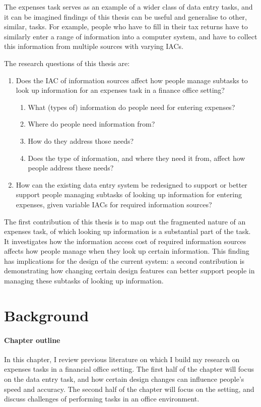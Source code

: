 \documentclass[11pt,oneside]{report}
\begin{document}
The expenses task serves as an example of a wider class of data entry tasks, and it can be imagined findings of this thesis can be useful and generalise to other, similar, tasks. For example, people who have to fill in their tax returns have to similarly enter a range of information into a computer system, and have to collect this information from multiple sources with varying IACs.

The research questions of this thesis are:

\begin{enumerate}
\item Does the IAC of information sources affect how people manage subtasks to look up information for an expenses task in a finance office setting?
\begin{enumerate}
\item	What (types of) information do people need for entering expenses?
\item	Where do people need information from?
\item	How do they address those needs?
\item	Does the type of information, and where they need it from, affect how people address these needs?
\end{enumerate}
\item	How can the existing data entry system be redesigned to support or better support people managing subtasks of looking up information for entering expenses, given variable IACs for required information sources?
\end{enumerate}


The first contribution of this thesis is to map out the fragmented nature of an expenses task, of which looking up information is a substantial part of the task. It investigates how the information access cost of required information sources affects how people manage when they look up certain information. This finding has implications for the design of the current system: a second contribution is demonstrating how changing certain design features can better support people in managing these subtasks of looking up information.



\chapter{Background}\label{ch:Background}

\begin{mynote}
\subsubsection{Chapter outline}
In this chapter, I review previous literature on which I build my research on expenses tasks in a financial office setting. The first half of the chapter will focus on the data entry task, and how certain design changes can influence people's speed and accuracy. The second half of the chapter will focus on the setting, and discuss challenges of performing tasks in an office environment.
\end{mynote}
\end{document}
